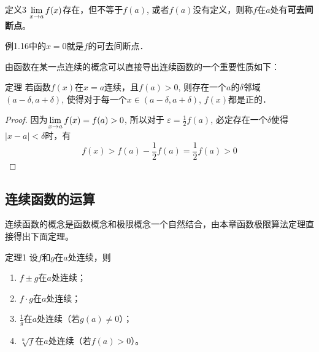 \begin{blk}
    {定义3} $\displaystyle\lim_{x\to a}f(x)$存在，但不等于$f(a)$, 或者$f(a)$没有定义，则称$f$在$a$处有\textbf{可去间断点}。
\end{blk}

例1.16中的$x=0$就是$f$的可去间断点．

由函数在某一点连续的概念可以直接导出连续函数的一个重要性质如下：

\begin{blk}
{定理} 若函数$f(x)$在$x=a$连续，且$f(a)>0$, 则存在一个$a$的$\delta$邻域$(a-\delta,a+\delta)$, 使得对于每一个$x\in (a-\delta,a+\delta)$, $f(x)$都是正的．    
\end{blk}

\begin{proof}
    因为$\displaystyle\lim_{x\to a} f(x)=f(a)>0$, 所以对于
$\varepsilon=\frac{1}{2}f(a)$, 必定存在一个$\delta$使得$|x-a|<\delta$时，有
\[f (x) > f (a) -\frac{1}{2}f (a) =\frac{1}{2}f (a) > 0\]
\end{proof}

\subsection{连续函数的运算}
连续函数的概念是函数概念和极限概念一个自然结合，由本章函数极限算法定理直接得出下面定理。

\begin{blk}
 {定理1} 设$f$和$g$在$a$处连续，则
 \begin{enumerate}
     \item $f\pm g$在$a$处连续；
     \item $f\cdot g$在$a$处连续；
     \item $\frac{1}{g}$在$a$处连续（若$g(a)\ne 0$）；
     \item $\sqrt[n]{f}$在$a$处连续（若$f(a)>0$）。
 \end{enumerate}
\end{blk}

